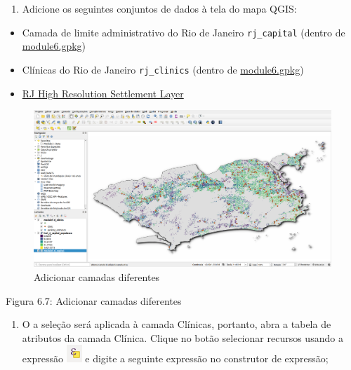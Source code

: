 \documentclass[
]{krantz}
\providecommand{\tightlist}{%
  \setlength{\itemsep}{0pt}\setlength{\parskip}{0pt}}
\begin{document}
\begin{enumerate}
\def\labelenumi{\arabic{enumi}.}
\tightlist
\item
  Adicione os seguintes conjuntos de dados à tela do mapa QGIS:
\end{enumerate}

\begin{itemize}
\tightlist
\item
  Camada de limite administrativo do Rio de Janeiro \texttt{rj\_capital} (dentro de \href{data/module6.gpkg}{module6.gpkg})
\item
  Clínicas do Rio de Janeiro \texttt{rj\_clinics} (dentro de \href{data/module6.gpkg}{module6.gpkg})
\item
  \href{data/hrsl_rj_capital_populacao.tif}{RJ High Resolution Settlement Layer}
\end{itemize}

\begin{figure}
\centering
\includegraphics{media/modulo6/add-layers.png}
\caption{Adicionar camadas diferentes}
\end{figure}

Figura 6.7: Adicionar camadas diferentes

\begin{enumerate}
\def\labelenumi{\arabic{enumi}.}
\setcounter{enumi}{1}
\tightlist
\item
  O a seleção será aplicada à camada Clínicas, portanto, abra a tabela de atributos da camada Clínica. Clique no botão selecionar recursos usando a expressão \includegraphics{media/modulo6/select_features_button.png} e digite a seguinte expressão no construtor de expressão;
\end{enumerate}
\end{document}
